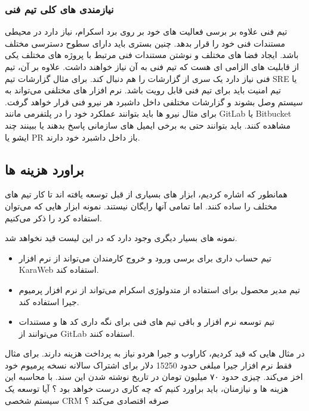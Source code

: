 \subsubsection{نیازمندی های کلی تیم فنی}
تیم فنی علاوه بر برسی فعالیت های خود بر روی برد اسکرام، نیاز دارد در محیطی مستندات فنی خود را قرار بدهد. چنین بستری باید دارای سطوح دسترسی مختلف باشد.
ایجاد فضا های مختلف و نوشتن مستندات فنی مرتبط با پروژه های مختلف یکی از قابلیت های الزامی ای هست که تیم فنی به آن نیاز خواهند داشت.
علاوه بر آن، تیم فنی نیاز دارد یک سری از گزارشات را هم دنبال کند. برای مثال گزارشات تیم SRE یا تیم امنیت باید برای تیم فنی قابل رویت باشد.
نرم افزار های مختلفی می‌تواند به سیستم وصل بشوند و گزارشات مختلفی داخل داشبرد هر نیرو فنی قرار خواهد گرفت.
برای مثال نیرو ها باید بتوانند عملکرد خود را در پلتفرمی مانند GitLab یا Bitbucket مشاهده کنند.
باید بتوانند حتی به برخی ایمیل های سازمانی پاسخ بدهند یا ببینند چند ایشو یا PR باز داخل داشبرد خود دارند.


\subsection{براورد هزینه ها}
همانطور که اشاره کردیم، ابزار های بسیاری از قبل توسعه یافته اند تا کار تیم های مختلف را ساده کنند. اما تمامی آنها رایگان نیستند.
نمونه ابزار هایی که می‌توان استفاده کرد را ذکر می‌کنیم.

نمونه های بسیار دیگری وجود دارد که در این لیست قید نخواهد شد.

\begin{itemize}
	\item تیم حساب داری برای برسی ورود و خروج کارمندان می‌تواند از نرم افزار KaraWeb استفاده کند.
	\item تیم مدیر محصول برای استفاده از متدولوژی اسکرام می‌تواند از نرم افزار پرمیوم جیرا استفاده کند.
	\item تیم توسعه نرم افزار و باقی تیم های فنی برای نگه داری کد ها و مستندات می‌توانند از GitLab استفاده کنند.
\end{itemize}

در مثال هایی که قید کردیم، کاراوب و جیرا هردو نیاز به پرداخت هزینه دارند.
برای مثال فقط نرم افزار جیرا مبلغی حدود 15250 دلار برای اشتراک سالانه نسخه پرمیوم خود اخز می‌کند. چیزی حدود ۷۰ میلیون تومان در تاریخ نوشته شدن این سند.
با محاسبه این هزینه ها و نیازمنان، باید براورد کنیم که چه کاری درست خواهد بود ؟
آیا توسعه یک سیستم شخصی CRM صرفه اقتصادی می‌کند ؟

